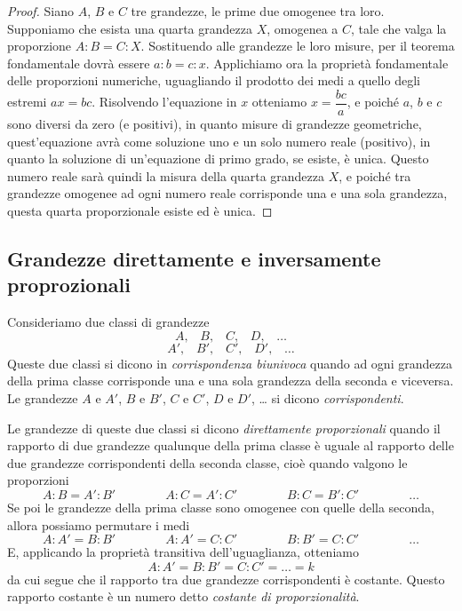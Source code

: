 \begin{proof}
Siano $A$, $B$ e $C$ tre grandezze, le prime due omogenee tra loro. Supponiamo che esista una quarta grandezza $X$, omogenea a $C$, tale che valga la proporzione $A : B = C : X$.
Sostituendo alle grandezze le loro misure, per il teorema fondamentale dovrà essere $a : b = c : x$.
Applichiamo ora la proprietà fondamentale delle proporzioni numeriche, uguagliando il prodotto dei medi a quello degli estremi $ax = bc$.
Risolvendo l'equazione in $x$ otteniamo $x = \dfrac{bc}{a}$, e poiché $a$, $b$ e $c$ sono diversi da zero (e positivi), in quanto misure di grandezze geometriche, quest'equazione avrà come soluzione uno e un solo numero reale (positivo), in quanto la soluzione di un'equazione di primo grado, se esiste, è unica.
Questo numero reale sarà quindi la misura della quarta grandezza $X$, e poiché tra grandezze omogenee ad ogni numero reale corrisponde una e una sola grandezza, questa quarta proporzionale esiste ed è unica.
\end{proof}

\subsection{Grandezze direttamente e inversamente proprozionali}

Consideriamo due classi di grandezze
\[A\text{,}\quad B\text{,}\quad C\text{,}\quad D\text{,}\quad \ldots{}\]
\[A'\text{,}\quad B'\text{,}\quad C'\text{,}\quad D'\text{,}\quad \ldots{}\]
Queste due classi si dicono in \emph{corrispondenza biunivoca} quando ad ogni grandezza della prima classe corrisponde una e una sola grandezza della seconda e viceversa.
Le grandezze $A$ e $A'$, $B$ e $B'$, $C$ e $C'$, $D$ e $D'$, \ldots{} si dicono \emph{corrispondenti}.

Le grandezze di queste due classi si dicono \emph{direttamente proporzionali} quando il rapporto di due grandezze qualunque della prima classe è uguale al rapporto delle due grandezze corrispondenti della seconda classe, cioè quando valgono le proporzioni
\[A : B = A' : B'\qquad\qquad A : C = A' : C'\qquad\qquad B : C = B' : C'\qquad\qquad\ldots{}\]
Se poi le grandezze della prima classe sono omogenee con quelle della seconda, allora possiamo permutare i medi
\[A : A' = B : B'\qquad\qquad A : A' = C : C'\qquad\qquad B : B' = C : C'\qquad\qquad\ldots{}\]
E, applicando la proprietà transitiva dell'uguaglianza, otteniamo
\[A : A' = B : B' = C : C' = \ldots{} = k\]
da cui segue che il rapporto tra due grandezze corrispondenti è costante. Questo rapporto costante è un numero detto \emph{costante di proporzionalità}.

